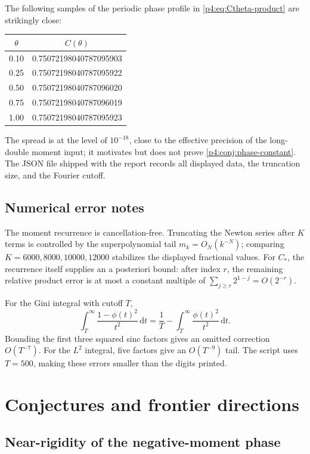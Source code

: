 \documentclass[11pt,oneside]{article}
\theoremstyle{definition}
\theoremstyle{remark}
\newcommand{\dd}{\,\mathrm d}
\newcommand{\1}{\mathbf 1}
\begin{document}
The following samples of the periodic phase profile in \cref{p4:eq:Ctheta-product} are
strikingly close:
\begin{center}
\begin{tabular}{@{}c@{\qquad}c@{}}
\toprule
\(\theta\)&\(C(\theta)\)\\
\midrule
0.10&0.75072198040787095903\\
0.25&0.75072198040787095922\\
0.50&0.75072198040787096020\\
0.75&0.75072198040787096019\\
1.00&0.75072198040787095923\\
\bottomrule
\end{tabular}
\end{center}
The spread is at the level of \(10^{-18}\), close to the effective precision of the
long-double moment input; it motivates but does not prove \cref{p4:conj:phase-constant}.
The JSON file shipped with the report records all displayed data, the truncation size,
and the Fourier cutoff.

\subsection{Numerical error notes}

The moment recurrence is cancellation-free.  Truncating the Newton series after \(K\)
terms is controlled by the superpolynomial tail \(m_k=O_N(k^{-N})\); comparing
\(K=6000,8000,10000,12000\) stabilizes the displayed fractional values.
For \(C_*\), the recurrence itself supplies an a posteriori bound: after index \(r\),
the remaining relative product error is at most a constant multiple of
\(\sum_{j\ge r}2^{1-j}=O(2^{-r})\).

For the Gini integral with cutoff \(T\),
\[
 \int_T^\infty\frac{1-\phi(t)^2}{t^2}\dd t
 =\frac1T-\int_T^\infty\frac{\phi(t)^2}{t^2}\dd t.
\]
Bounding the first three squared sinc factors gives an omitted correction
\(O(T^{-7})\).  For the \(L^2\) integral, five factors give an \(O(T^{-9})\) tail.
The script uses \(T=500\), making these errors smaller than the digits printed.

\section{Conjectures and frontier directions}

\subsection{Near-rigidity of the negative-moment phase}
\end{document}
